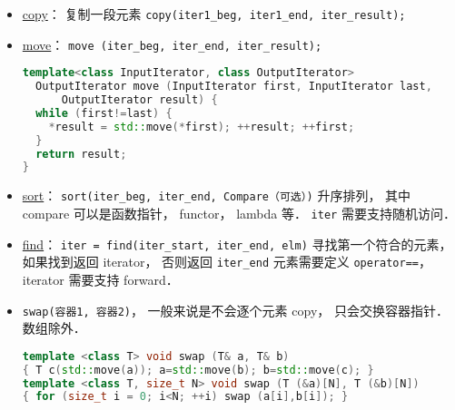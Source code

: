 
\begin{issues}
\issueDraft
\end{issues}

\begin{itemize}
\item \href{https://cplusplus.com/reference/algorithm/copy/}{copy}： 复制一段元素 \verb|copy(iter1_beg, iter1_end, iter_result);|
\item \href{https://cplusplus.com/reference/algorithm/move/}{move}： \verb|move (iter_beg, iter_end, iter_result);|
\begin{lstlisting}[language=cpp]
template<class InputIterator, class OutputIterator>
  OutputIterator move (InputIterator first, InputIterator last,
      OutputIterator result) {
  while (first!=last) {
    *result = std::move(*first); ++result; ++first;
  }
  return result;
}
\end{lstlisting}
\item \href{https://cplusplus.com/reference/algorithm/sort/}{sort}： \verb|sort(iter_beg, iter_end, Compare（可选）)| 升序排列， 其中 compare 可以是函数指针， functor， lambda 等． \verb|iter| 需要支持随机访问．
\item \href{https://cplusplus.com/reference/algorithm/find/}{find}： \verb|iter = find(iter_start, iter_end, elm)| 寻找第一个符合的元素， 如果找到返回 iterator， 否则返回 \verb|iter_end| 元素需要定义 \verb|operator==|， iterator 需要支持 forward．
\item \verb|swap(容器1, 容器2)|， 一般来说是不会逐个元素 copy， 只会交换容器指针． 数组除外．
\begin{lstlisting}[language=cpp]
template <class T> void swap (T& a, T& b)
{ T c(std::move(a)); a=std::move(b); b=std::move(c); }
template <class T, size_t N> void swap (T (&a)[N], T (&b)[N])
{ for (size_t i = 0; i<N; ++i) swap (a[i],b[i]); }
\end{lstlisting}
\end{itemize}
